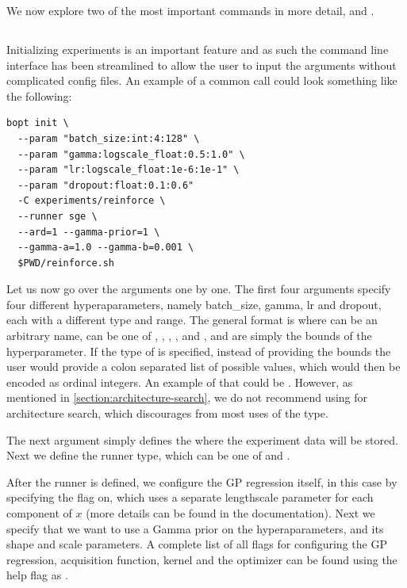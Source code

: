 We now explore two of the most important commands in more detail,  and .

\subsection{}

Initializing experiments is an important feature and as such the command line interface has been streamlined to allow the user to input the arguments without complicated config files. An example of a common  call could look something like the following:

\begin{center}
\begin{verbatim}
bopt init \
  --param "batch_size:int:4:128" \
  --param "gamma:logscale_float:0.5:1.0" \
  --param "lr:logscale_float:1e-6:1e-1" \
  --param "dropout:float:0.1:0.6"
  -C experiments/reinforce \
  --runner sge \
  --ard=1 --gamma-prior=1 \
  --gamma-a=1.0 --gamma-b=0.001 \
  $PWD/reinforce.sh
\end{verbatim}	
\end{center}


Let us now go over the arguments one by one. The first four arguments specify four different hyperaparameters, namely batch\_size, gamma, lr and dropout, each with a different type and range. The general format is  where  can be an arbitrary name,  can be one of , , , , and , and  are simply the bounds of the hyperparameter. If the type of  is specified, instead of providing the bounds the user would provide a colon separated list of possible values, which would then be encoded as ordinal integers. An example of that could be . However, as mentioned in \autoref{section:architecture-search}, we do not recommend using \bopt for architecture search, which discourages from most uses of the  type.

The next argument  simply defines the  where the experiment data will be stored. Next we define the runner type, which can be one of  and .

After the runner is defined, we configure the GP regression itself, in this case by specifying the  flag on, which uses a separate lengthscale parameter for each component of $x$ (more details can be found in the \cite{gpy} documentation). Next we specify that we want to use a Gamma prior on the hyperaparameters, and its shape and scale parameters. A complete list of all flags for configuring the GP regression, acquisition function, kernel and the optimizer can be found using the help flag as .

